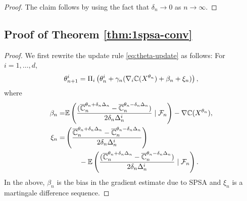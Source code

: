 \begin{proof}
The claim follows by using the fact that $\delta_n \rightarrow 0$ as $n\rightarrow \infty$.
\end{proof}

\subsection*{Proof of Theorem \ref{thm:1spsa-conv}}

\begin{proof}

We first rewrite the update rule \eqref{eq:theta-update} as follows: For $i=1,\ldots,d$,
\begin{align}
\theta^{i}_{n+1}  =  \Pi_i\left(\theta^{i}_n +  \gamma_n(\nabla_{i} \mathbb{C}(X^{\theta_n}) + \beta_n + \xi_n)\right), 
\label{eq:1spsa-equiv}
\end{align}
where 
\begin{align*}
\beta_n = &\mathbb{E}\left(\dfrac{(\overline {\mathbb{C}}_n^{\theta_n + \delta_n \Delta_n} -\overline {\mathbb{C}}_n^{\theta_n - \delta_n \Delta_n})}{2 \delta_n \Delta_n^{i}} \mid \mathcal{F}_n \right) - \nabla \mathbb{C}(X^{\theta_n}),\\
\xi_n = & \left(\dfrac{\overline {\mathbb{C}}_n^{\theta_n + \delta_n \Delta_n} -\overline {\mathbb{C}}_n^{\theta_n - \delta_n \Delta_n}}{2 \delta_n\Delta_n^{i}}\right) \\
&\qquad - \mathbb{E}\left(\dfrac{(\overline {\mathbb{C}}_n^{\theta_n + \delta_n \Delta_n} -\overline {\mathbb{C}}_n^{\theta_n - \delta_n \Delta_n})}{2 \delta_n \Delta_n^{i}}\mid \mathcal{F}_n \right).
\end{align*}
In the above, $\beta_n$ is the bias in the gradient estimate due to SPSA and $\xi_n$ is a martingale difference sequence.


\end{proof}

